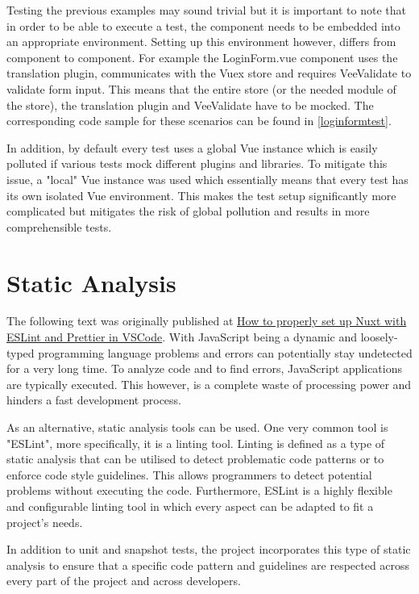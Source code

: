 Testing the previous examples may sound trivial but it is important to note that in order to be able to execute a test, the component needs to be embedded into an appropriate environment. Setting up this environment however, differs from component to component. For example the LoginForm.vue component uses the translation plugin, communicates with the Vuex store and requires VeeValidate to validate form input. This means that the entire store (or the needed module of the store), the translation plugin and VeeValidate have to be mocked. The corresponding code sample for these scenarios can be found in \autoref{loginformtest}.

In addition, by default every test uses a global Vue instance which is easily polluted if various tests mock different plugins and libraries. To mitigate this issue, a "local" Vue instance was used which essentially means that every test has its own isolated Vue environment. This makes the test setup significantly more complicated but mitigates the risk of global pollution and results in more comprehensible tests. 

\section{Static Analysis}
The following text was originally published at \href{https://medium.com/@gogl.alex/how-to-properly-set-up-eslint-with-prettier-for-vue-or-nuxt-in-vscode-e42532099a9c}{How to properly set up Nuxt with ESLint and Prettier in VSCode}.
With JavaScript being a dynamic and loosely-typed programming language problems and errors can potentially stay undetected for a very long time. To analyze code and to find errors, JavaScript applications are typically executed. This however, is a complete waste of processing power and hinders a fast development process.

As an alternative, static analysis tools can be used. One very common tool is "ESLint", more specifically, it is a linting tool. Linting is defined as a type of static analysis that can be utilised to detect problematic code patterns or to enforce code style guidelines. This allows programmers to detect potential problems without executing the code. Furthermore, ESLint is a highly flexible and configurable linting tool in which every aspect can be adapted to fit a project's needs.

In addition to unit and snapshot tests, the project incorporates this type of static analysis to ensure that a specific code pattern and guidelines are respected across every part of the project and across developers.

